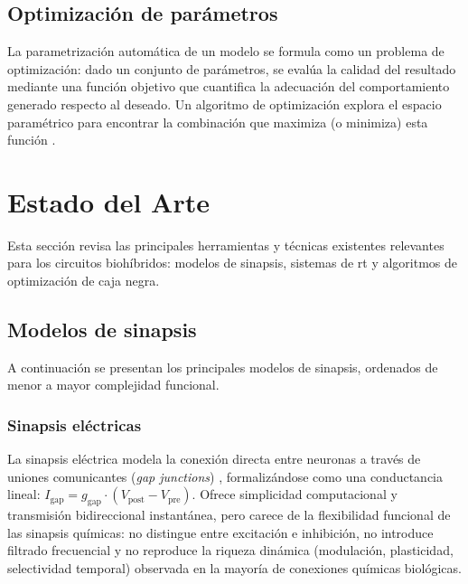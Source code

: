 \subsection{Optimización de parámetros\label{SS:OPTIMIZACION}}

La parametrización automática de un modelo se formula como un problema de optimización: dado un conjunto de parámetros, se evalúa la calidad del resultado mediante una función objetivo que cuantifica la adecuación del comportamiento generado respecto al deseado. Un algoritmo de optimización explora el espacio paramétrico para encontrar la combinación que maximiza (o minimiza) esta función \cite{Nelder1965, Holland1975, Kennedy1995, Hansen2001, Shahriari2016, ReyesSnchez2023}.

\section{Estado del Arte\label{SEC:ESTADODELARTE}}

Esta sección revisa las principales herramientas y técnicas existentes relevantes para los circuitos biohíbridos: modelos de sinapsis, sistemas de \ac{rt} y algoritmos de optimización de caja negra.

\subsection{Modelos de sinapsis\label{SS:MODELOS_SINAPSIS}}

A continuación se presentan los principales modelos de sinapsis, ordenados de menor a mayor complejidad funcional.

\subsubsection{Sinapsis eléctricas}

La sinapsis eléctrica modela la conexión directa entre neuronas a través de uniones comunicantes (\textit{gap junctions}) \cite{GurelKazanci2007}, formalizándose como una conductancia lineal: $I_{\mathrm{gap}} = g_{\mathrm{gap}} \cdot (V_{\mathrm{post}} - V_{\mathrm{pre}})$. Ofrece simplicidad computacional y transmisión bidireccional instantánea, pero carece de la flexibilidad funcional de las sinapsis químicas: no distingue entre excitación e inhibición, no introduce filtrado frecuencial y no reproduce la riqueza dinámica (modulación, plasticidad, selectividad temporal) observada en la mayoría de conexiones químicas biológicas.

